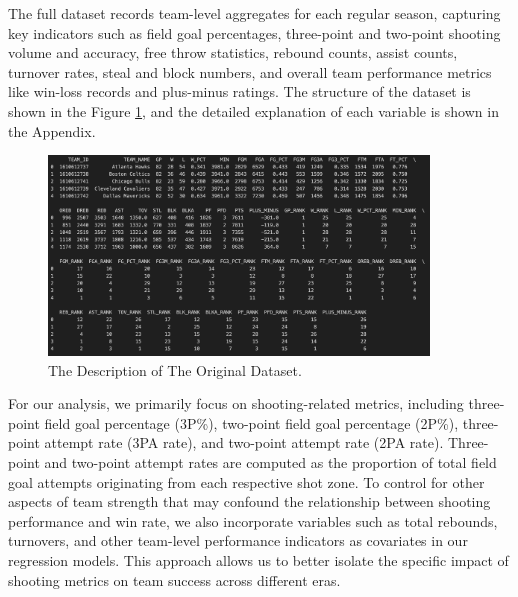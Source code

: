 \documentclass[11pt, a4paper]{article} %
\begin{document}
The full dataset records team-level aggregates for each regular season, capturing key indicators such as 
field goal percentages, three-point and two-point shooting volume and accuracy, free throw statistics, 
rebound counts, assist counts, turnover rates, steal and block numbers, and overall team performance metrics 
like win-loss records and plus-minus ratings. The structure of the dataset is shown in the Figure \ref{fig:original_data}, and the 
detailed explanation of each variable is shown in the Appendix.
\begin{figure}[htbp]
    \centering
    \includegraphics[width=0.9\textwidth]{figure/original_data.png}
    \caption{The Description of The Original Dataset.}
    \label{fig:original_data}
\end{figure}

For our analysis, we primarily focus on shooting-related metrics, including three-point field goal percentage (3P\%), 
two-point field goal percentage (2P\%), three-point attempt rate (3PA rate), and two-point attempt rate (2PA rate). 
Three-point and two-point attempt rates are computed as the proportion of total field goal attempts originating from 
each respective shot zone. To control for other aspects of team strength that may confound the relationship between 
shooting performance and win rate, we also incorporate variables such as total rebounds, turnovers, and other 
team-level performance indicators as covariates in our regression models. This approach allows us to better isolate 
the specific impact of shooting metrics on team success across different eras.
\end{document}
